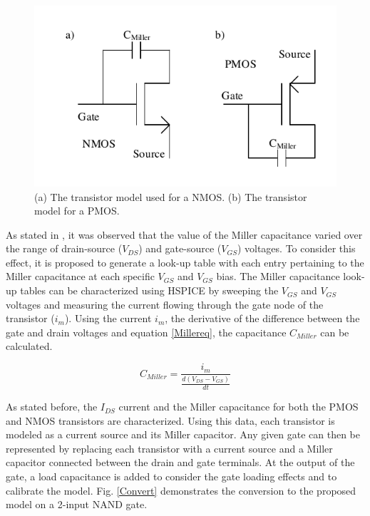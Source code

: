 \begin{figure}[!htbp]
	\centering
	\includegraphics[width=0.50\linewidth]{Figures/TransistorModel}
	\caption{(a) The transistor model used for a NMOS. (b) The transistor model for a PMOS.}
	\label{TModel}
\end{figure}

As stated in \cite{Accurate_Masking}, it was observed that the value of the Miller capacitance varied over the range of drain-source ($V_{DS}$) and gate-source ($V_{GS}$) voltages. To consider this effect, it is proposed to generate a look-up table with each entry pertaining to the Miller capacitance at each specific $V_{GS}$ and $V_{GS}$ bias. The Miller capacitance look-up tables can be characterized using HSPICE by sweeping the $V_{GS}$ and $V_{GS}$ voltages and measuring the current flowing through the gate node of the transistor ($i_m$). Using the current $i_m$, the derivative of the difference between the gate and drain voltages and equation \ref{Millereq}, the capacitance $C_{Miller}$ can be calculated.

\begin{equation}\label{Millereq}
C_{Miller} = \frac{i_m}{\frac{d(V_{DS}-V_{GS})}{dt}}
\end{equation}

As stated before, the $I_{DS}$ current and the Miller capacitance for both the PMOS and NMOS transistors are characterized. Using this data, each transistor is modeled as a current source and its Miller capacitor. Any given gate can then be represented by replacing each transistor with a current source and a Miller capacitor connected between the drain and gate terminals. At the output of the gate, a load capacitance is added to consider the gate loading effects and to calibrate the model. Fig. \ref{Convert} demonstrates the conversion to the proposed model on a 2-input NAND gate.

